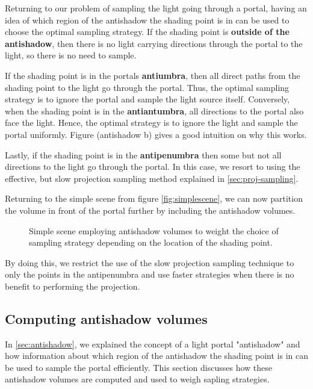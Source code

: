 Returning to our problem of sampling the light going through a portal, having an idea of which region of the antishadow the shading point is in can be used to choose the optimal sampling strategy. If the shading point is \textbf{outside of the antishadow}, then there is no light carrying directions through the portal to the light, so there is no need to sample.

If the shading point is in the portals \textbf{antiumbra}, then all direct paths from the shading point to the light go through the portal. Thus, the optimal sampling strategy is to ignore the portal and sample the light source itself. Conversely, when the shading point is in the \textbf{antiantumbra}, all directions to the portal also face the light. Hence, the optimal strategy is to ignore the light and sample the portal uniformly. Figure (antishadow b) gives a good intuition on why this works.

Lastly, if the shading point is in the \textbf{antipenumbra} then some but not all directions to the light go through the portal. In this case, we resort to using the effective, but slow projection sampling method explained in \autoref{sec:proj-sampling}. 

Returning to the simple scene from figure \autoref{fig:simplescene}, we can now partition the volume in front of the portal further by including the antishadow volumes. 

\begin{figure}[H]
  \def\svgwidth{0.5\columnwidth}
  
  \label{fig:simplescene-antishadow}
  \caption{Simple scene employing antishadow volumes to weight the choice of sampling strategy depending on the location of the shading point.}
\end{figure}

By doing this, we restrict the use of the slow projection sampling technique to only the points in the antipenumbra and use faster strategies when there is no benefit to performing the projection.

\subsection{Computing antishadow volumes}

In \autoref{sec:antishadow}, we explained the concept of a light portal "antishadow" and how information about which region of the antishadow the shading point is in can be used to sample the portal efficiently. This section discusses how these antishadow volumes are computed and used to weigh sapling strategies.

